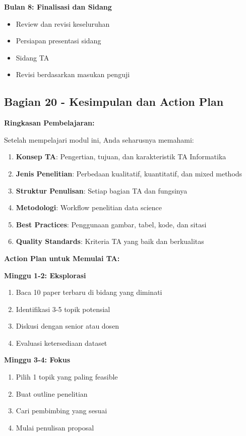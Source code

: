\textbf{Bulan 8: Finalisasi dan Sidang}
\begin{itemize}
    \item Review dan revisi keseluruhan
    \item Persiapan presentasi sidang
    \item Sidang TA
    \item Revisi berdasarkan masukan penguji
\end{itemize}

\subsection*{Bagian 20 - Kesimpulan dan Action Plan}

\textbf{Ringkasan Pembelajaran:}

Setelah mempelajari modul ini, Anda seharusnya memahami:
\begin{enumerate}
    \item \textbf{Konsep TA}: Pengertian, tujuan, dan karakteristik TA Informatika
    \item \textbf{Jenis Penelitian}: Perbedaan kualitatif, kuantitatif, dan mixed methods
    \item \textbf{Struktur Penulisan}: Setiap bagian TA dan fungsinya
    \item \textbf{Metodologi}: Workflow penelitian data science
    \item \textbf{Best Practices}: Penggunaan gambar, tabel, kode, dan sitasi
    \item \textbf{Quality Standards}: Kriteria TA yang baik dan berkualitas
\end{enumerate}

\textbf{Action Plan untuk Memulai TA:}

\textbf{Minggu 1-2: Eksplorasi}
\begin{enumerate}
    \item Baca 10 paper terbaru di bidang yang diminati
    \item Identifikasi 3-5 topik potensial
    \item Diskusi dengan senior atau dosen
    \item Evaluasi ketersediaan dataset
\end{enumerate}

\textbf{Minggu 3-4: Fokus}
\begin{enumerate}
    \item Pilih 1 topik yang paling feasible
    \item Buat outline penelitian
    \item Cari pembimbing yang sesuai
    \item Mulai penulisan proposal
\end{enumerate}

